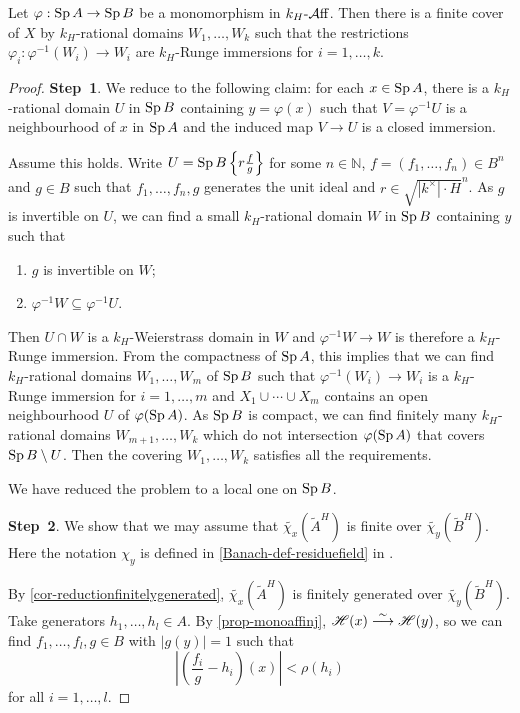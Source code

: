 \begin{thm}\label{thm-GG}
    Let $\varphi:\operatorname{Sp} A\rightarrow \operatorname{Sp} B$ be a monomorphism in $k_H\text{-}\mathcal{A}\mathrm{ff}$. Then there is a finite cover of $X$ by $k_H$-rational domains $W_1,\ldots,W_k$ such that the restrictions $\varphi_i:\varphi^{-1}(W_i)\rightarrow W_i$ are $k_H$-Runge immersions for $i=1,\ldots,k$.
\end{thm}
\begin{proof}
    \textbf{Step~1}. We reduce to the following claim: for each $x\in \operatorname{Sp} A$, there is a $k_H$-rational domain $U$ in $\operatorname{Sp} B$ containing $y=\varphi(x)$ such that $V=\varphi^{-1}U$ is a neighbourhood of $x$ in $\operatorname{Sp} A$ and the induced map $V\rightarrow U$ is a closed immersion.

    Assume this holds. Write $U=\operatorname{Sp} B\left\{r\frac{f}{g}\right\}$ for some $n\in \mathbb{N}$, $f=(f_1,\ldots,f_n)\in B^n$ and $g\in B$ such that $f_1,\ldots,f_n,g$ generates the unit ideal and $r\in \sqrt{|k^{\times}|\cdot H}^n$. As $g$ is invertible on $U$, we can find a small $k_H$-rational domain $W$ in $\operatorname{Sp} B$ containing $y$ such that
    \begin{enumerate}
        \item $g$ is invertible on $W$;
        \item $\varphi^{-1}W \subseteq \varphi^{-1}U$.
    \end{enumerate}
    Then $U\cap W$ is a $k_H$-Weierstrass domain in $W$ and $\varphi^{-1}W\rightarrow W$ is therefore a $k_H$-Runge immersion. From the compactness of $\operatorname{Sp} A$, this implies that we can find $k_H$-rational domains $W_1,\ldots,W_m$ of $\operatorname{Sp} B$ such that $\varphi^{-1}(W_i)\rightarrow W_i$ is a $k_H$-Runge immersion for $i=1,\ldots,m$ and $X_1\cup\cdots\cup X_m$ contains an open neighbourhood $U$ of $\varphi(\operatorname{Sp} A)$. As $\operatorname{Sp} B$ is compact, we can find finitely many $k_H$-rational domains $W_{m+1},\ldots,W_{k}$ which do not intersection $\varphi(\operatorname{Sp} A)$ that covers $\operatorname{Sp} B\setminus U$. Then the covering $W_1,\ldots,W_k$ satisfies all the requirements.
    
    We have reduced the problem to a local one on $\operatorname{Sp} B$.


    \textbf{Step~2}. We show that we may assume that $\widetilde{\chi_x}(\tilde{A}^H)$ is finite over $\widetilde{\chi_y}(\tilde{B}^H)$. Here the notation $\chi_y$ is defined in \cref{Banach-def-residuefield} in .

    By \cref{cor-reductionfinitelygenerated}, $\widetilde{\chi_x}(\tilde{A}^H)$ is finitely generated over $\widetilde{\chi_y}(\tilde{B}^H)$. Take  generators $h_1,\ldots,h_l\in A$. By \cref{prop-monoaffinj}, $\mathscr{H}(x)\stackrel{\sim}{\longrightarrow} \mathscr{H}(y)$, so we can find $f_1,\ldots,f_l,g\in B$ with $|g(y)|=1$ such that 
    \[
        \left| \left(\frac{f_i}{g}-h_i\right)(x) \right|<\rho(h_i)  
    \]
    for all $i=1,\ldots,l$. 
    

\end{proof}
